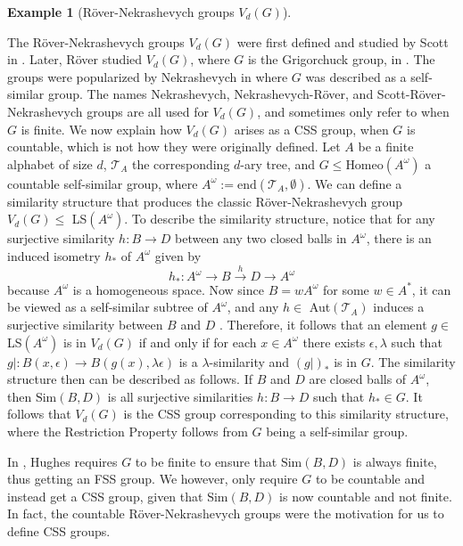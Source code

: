 \documentclass[12pt]{amsart}
\numberwithin{equation}{subsection}
\theoremstyle{definition}
\theoremstyle{definition}
\newtheorem{example}[theorem]{Example}
\theoremstyle{remark}
\begin{document}
\begin{example}[R\"over-Nekrashevych groups $V_d(G)$]\label{ex:RNgroups}



The R\"over-Nekrashevych groups $V_d(G)$ were first defined and studied by Scott in \cite{scott1984construction}. Later, R\"over studied $V_d(G)$, where $G$ is the Grigorchuck group, in \cite{rover1999constructing}. The groups were popularized by Nekrashevych in \cite{nekrashevych2004cuntz} where $G$ was described as a self-similar group. The names Nekrashevych, Nekrashevych-R\"over, and Scott-R\"over-Nekrashevych groups are all used for $V_d(G)$, and sometimes only refer to when $G$ is finite. We now explain how $V_d(G)$ arises as a CSS group, when $G$ is countable, which is not how they were originally defined. Let $A$ be a finite alphabet of size $d$, $\mathcal T_A$ the corresponding $d$-ary tree, and $G \le \text{Homeo}(A^\omega)$ a countable self-similar group, where $A^\omega := \text{end}(\mathcal{T}_A, \emptyset)$. We can define a similarity structure that produces the classic R\"over-Nekrashevych group $V_d(G) \leq$ LS$(A^\omega)$. To describe the similarity structure, notice that for any surjective similarity $h:B \rightarrow D$ between any two closed balls in $A^\omega$, there is an induced isometry $h_*$ of $A^\omega$ given by 
\[h_*: A^\omega \rightarrow B \xrightarrow h D \rightarrow A^\omega \]
because $A^\omega$ is a homogeneous space. Now since $B=wA^\omega$ for some $w \in A^*$, it can be viewed as a self-similar subtree of $A^\omega$, and any $h \in$ Aut$(\mathcal T_A)$ induces a surjective similarity between $B$ and $D$ . Therefore, it follows that an element $g \in $ LS$(A^\omega)$ is in $V_d(G)$ if and only if for each $x \in A^\omega$ there exists $\epsilon, \lambda$ such that $g\vert :B(x,\epsilon) \rightarrow B(g(x), \lambda\epsilon)$ is a $\lambda$-similarity and $(g\vert )_*$ is in $G$. The similarity structure then can be described as follows. If $B$ and $D$ are closed balls of $A^\omega$, then  $\text{Sim}(B,D)$ is all surjective similarities $h: B \rightarrow D$ such that $h_* \in G$. It follows that $V_d(G)$ is the CSS group corresponding to this similarity structure, where the Restriction Property follows from $G$ being a self-similar group. 

In \cite[Example 4.4]{hughes2009}, Hughes requires $G$ to be finite to ensure that  $\text{Sim}(B,D)$ is always finite, thus getting an FSS group. We however, only require $G$ to be countable and instead get a CSS group, given that  $\text{Sim}(B,D)$ is now countable and not finite. In fact, the countable R\"over-Nekrashevych groups were the motivation for us to define CSS groups. 


\end{example}
\end{document}
